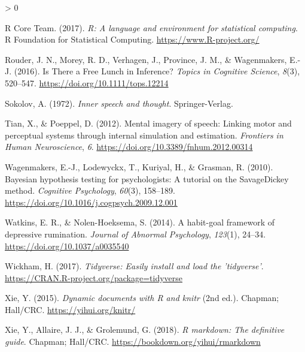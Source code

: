 \documentclass[
  english,
  man, donotrepeattitle,floatsintext]{apa6}
\newlength{\cslhangindent}
\newenvironment{CSLReferences}[2] %
 {%
  \setlength{\parindent}{0pt}
  \ifodd #1 \everypar{\setlength{\hangindent}{\cslhangindent}}\ignorespaces\fi
  \ifnum #2 > 0
  \setlength{\parskip}{#2\baselineskip}
  \fi
 }%
 {}
\begin{document}
\begin{CSLReferences}{1}{0}
\leavevmode\hypertarget{ref-R-base}{}%
R Core Team. (2017). \emph{R: A language and environment for statistical computing}. R Foundation for Statistical Computing. \url{https://www.R-project.org/}

\leavevmode\hypertarget{ref-rouder_is_2016}{}%
Rouder, J. N., Morey, R. D., Verhagen, J., Province, J. M., \& Wagenmakers, E.-J. (2016). Is {There} a {Free Lunch} in {Inference}? \emph{Topics in Cognitive Science}, \emph{8}(3), 520--547. \url{https://doi.org/10.1111/tops.12214}

\leavevmode\hypertarget{ref-sokolov_inner_1972}{}%
Sokolov, A. (1972). \emph{Inner speech and thought}. {Springer-Verlag}.

\leavevmode\hypertarget{ref-tian_mental_2012}{}%
Tian, X., \& Poeppel, D. (2012). Mental imagery of speech: Linking motor and perceptual systems through internal simulation and estimation. \emph{Frontiers in Human Neuroscience}, \emph{6}. \url{https://doi.org/10.3389/fnhum.2012.00314}

\leavevmode\hypertarget{ref-wagenmakers_bayesian_2010}{}%
Wagenmakers, E.-J., Lodewyckx, T., Kuriyal, H., \& Grasman, R. (2010). Bayesian hypothesis testing for psychologists: {A} tutorial on the {Savage}{{Dickey}} method. \emph{Cognitive Psychology}, \emph{60}(3), 158--189. \url{https://doi.org/10.1016/j.cogpsych.2009.12.001}

\leavevmode\hypertarget{ref-watkins_habit-goal_2014}{}%
Watkins, E. R., \& Nolen-Hoeksema, S. (2014). A habit-goal framework of depressive rumination. \emph{Journal of Abnormal Psychology}, \emph{123}(1), 24--34. \url{https://doi.org/10.1037/a0035540}

\leavevmode\hypertarget{ref-R-tidyverse}{}%
Wickham, H. (2017). \emph{Tidyverse: Easily install and load the 'tidyverse'}. \url{https://CRAN.R-project.org/package=tidyverse}

\leavevmode\hypertarget{ref-R-knitr}{}%
Xie, Y. (2015). \emph{Dynamic documents with {R} and knitr} (2nd ed.). Chapman; Hall/CRC. \url{https://yihui.org/knitr/}

\leavevmode\hypertarget{ref-R-rmarkdown}{}%
Xie, Y., Allaire, J. J., \& Grolemund, G. (2018). \emph{R markdown: The definitive guide}. Chapman; Hall/CRC. \url{https://bookdown.org/yihui/rmarkdown}

\end{CSLReferences}
\end{document}
